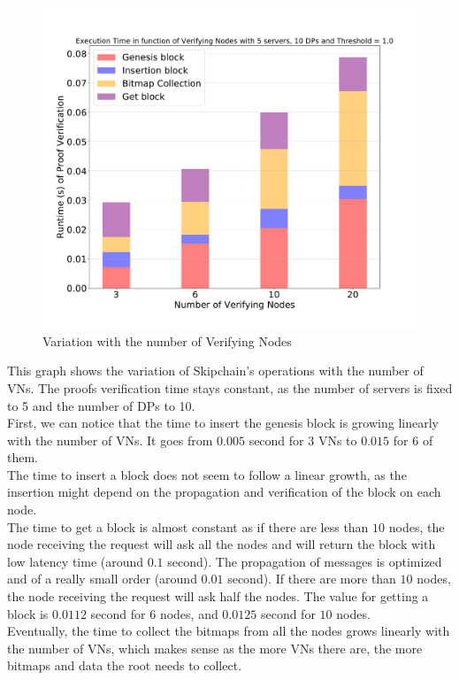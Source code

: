 \documentclass{article}
\begin{document}
\begin{figure}[H]
\includegraphics[scale=0.5]{variationVN}
\caption{Variation with the number of Verifying Nodes}
\end{figure}


This graph shows the variation of Skipchain's operations with the number of VNs. The proofs verification time stays constant, as the number of servers is fixed to 5 and the number of DPs to 10.\\
First, we can notice that the time to insert the genesis block is growing linearly with the number of VNs. It goes from $0.005$ second for $3$ VNs to $0.015$ for $6$ of them.\\
The time to insert a block does not seem to follow a linear growth, as the insertion might depend on the propagation and verification of the block on each node.\\
The time to get a block is almost constant as if there are less than $10$ nodes, the node receiving the request will ask all the nodes and will return the block with low latency time (around $0.1$ second). The propagation of messages is optimized and of a really small order (around $0.01$ second). If there are more than $10$ nodes, the node receiving the request will ask half the nodes. The value for getting a block is $0.0112$ second for $6$ nodes, and $0.0125$ second for $10$ nodes.\\
Eventually, the time to collect the bitmaps from all the nodes grows linearly with the number of VNs, which makes sense as the more VNs there are, the more bitmaps and data the root needs to collect.
\end{document}

